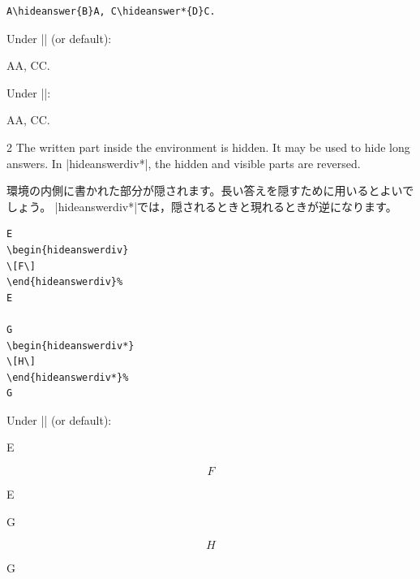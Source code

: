 \documentclass[%
fleqn,%
paper=a4paper,%
fontsize=10pt,%
open_bracket_pos=zenkakunibu_nibu,%
hanging_punctuation,%
]%
{jlreq}
\newenvironment{translateing}%
{\begin{multicolpar}{2}}
{\end{multicolpar}\vspace{\baselineskip}}
\DeclareRobustCommand{\commandtojskip}{\hspace{2.40554pt plus 1.49994pt minus 0.59998pt}}
\begin{document}
\begin{lstlisting}
A\hideanswer{B}A, C\hideanswer*{D}C.
\end{lstlisting}

\hspace*{0.14\textwidth}Under |\unsethideanswer| (or default):\\
\unsethideanswer
\begin{macroexample}
AA, CC.
\end{macroexample}

\hspace*{0.14\textwidth}Under |\sethideanswer|:\\
\sethideanswer
\begin{macroexample}
AA, CC.
\end{macroexample}

\newpage
{}

\begin{translateing}
The written part inside the environment is hidden. It may be used to hide long answers. In |hideanswerdiv*|, the hidden and visible parts are reversed.

環境の内側に書かれた部分が隠されます。長い答えを隠すために用いるとよいでしょう。
|hideanswerdiv*|\commandtojskip では，隠されるときと現れるときが逆になります。
\end{translateing}

\begin{lstlisting}
E
\begin{hideanswerdiv}
\[F\]
\end{hideanswerdiv}%
E

G
\begin{hideanswerdiv*}
\[H\]
\end{hideanswerdiv*}%
G
\end{lstlisting}

\hspace*{0.14\textwidth}Under |\unsethideanswer| (or default):\\
\unsethideanswer
\begin{macroexample}
E
\begin{hideanswerdiv}
\[F\]
\end{hideanswerdiv}%
E

G
\begin{hideanswerdiv*}
\[H\]
\end{hideanswerdiv*}%
G
\end{macroexample}
\end{document}
